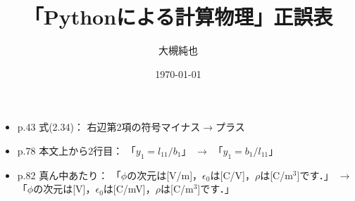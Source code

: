\documentclass[11pt]{jsarticle}
\title{ 「Pythonによる計算物理」正誤表}
\author{大槻純也}
\date{\today}
\begin{document}
\maketitle

\begin{itemize}

\item
p.43 式(2.34)： 右辺第2項の符号マイナス$\to$プラス

\item
p.78 本文上から2行目：
「$y_1 = l_{11}/b_1$」
$\to$
「$y_1 = b_1/l_{11}$」

\item
p.82 真ん中あたり：
「$\phi$の次元は[V/m]，$\epsilon_0$は[C/V]，$\rho$は[C/m$^3$]です．」
$\to$
「$\phi$の次元は[V]，$\epsilon_0$は[C/mV]，$\rho$は[C/m$^3$]です．」

\end{itemize}
\end{document}
